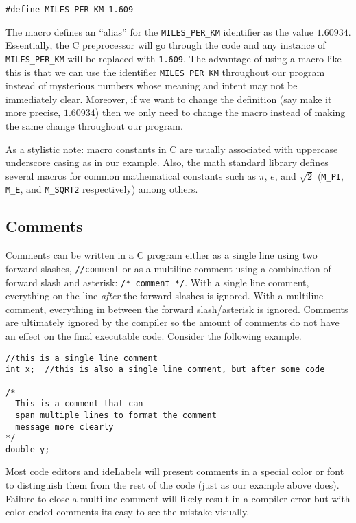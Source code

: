 \begin{verbatim}
#define MILES_PER_KM 1.609
\end{verbatim}

The macro defines an ``alias'' for the \texttt{MILES_PER_KM} identifier as the
value $1.60934$.  Essentially, the C preprocessor will go through the code and any
instance of \texttt{MILES_PER_KM} will be replaced with \texttt{1.609}.
The advantage of using a macro like this is that we can use the identifier \texttt{MILES_PER_KM}
throughout our program instead of mysterious numbers whose meaning and intent
may not be immediately clear.  Moreover, if we want to change the definition (say make it more
precise, $1.60934$) then we only need to change the macro instead of making the
same change throughout our program.

As a stylistic note: macro constants in C are usually associated with uppercase 
underscore casing as in our example.  Also, the math standard library defines several
macros for common mathematical constants such as $\pi$, $e$, and $\sqrt{2}$ 
(\texttt{M_PI}, \texttt{M_E}, and \texttt{M_SQRT2} 
respectively) among others.

\subsection{Comments}

Comments can be written in a C program either as a single line using
two forward slashes, \texttt{//comment} or as a multiline comment using
a combination of forward slash and asterisk: \texttt{/* comment */}.  
With a single line comment, everything on the line \emph{after} the forward
slashes is ignored.  With a multiline comment, everything in between the forward
slash/asterisk is ignored.  Comments are ultimately ignored by the compiler so
the amount of comments do not have an effect on the final executable code.
Consider the following example.

\begin{verbatim}
//this is a single line comment
int x;  //this is also a single line comment, but after some code

/*
  This is a comment that can 
  span multiple lines to format the comment
  message more clearly
*/
double y;
\end{verbatim}

Most code editors and \glspl{ideLabel} will present comments in a special color or
font to distinguish them from the rest of the code (just as our example above does).
Failure to close a multiline comment will likely result in a compiler error but with
color-coded comments its easy to see the mistake visually.

